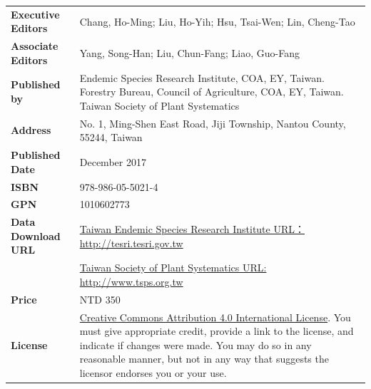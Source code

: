 \begin{table}[H]
{\begin{tabular}{>{\raggedleft\arraybackslash}p{3cm}p{10cm}}
      \textbf{Executive Editors}  & Chang, Ho-Ming; Liu, Ho-Yih; Hsu, Tsai-Wen; Lin, Cheng-Tao \\
      \textbf{Associate Editors}  & Yang, Song-Han; Liu, Chun-Fang; Liao, Guo-Fang \\
      \textbf{Published by}       & Endemic Species Research Institute, COA, EY, Taiwan.
                                    Forestry Bureau, Council of Agriculture, COA, EY, Taiwan.
                                    Taiwan Society of Plant Systematics \\
      \textbf{Address}            & No. 1, Ming-Shen East Road, Jiji Township, Nantou County, 55244, Taiwan \\
      \textbf{Published Date}     & December 2017 \\
      \textbf{ISBN}               & 978-986-05-5021-4 \\
      \textbf{GPN}                & 1010602773 \\
      \textbf{Data Download URL}  & \href{http://tesri.tesri.gov.tw}{Taiwan Endemic Species Research Institute URL：http://tesri.tesri.gov.tw} \\
                                  & \href{http://www.tsps.org.tw}{Taiwan Society of Plant Systematics URL: http://www.tsps.org.tw} \\
      \textbf{Price}              & NTD 350 \\
      \textbf{License}            & \href{https://creativecommons.org/licenses/by/4.0}{Creative Commons Attribution 4.0 International License}.
                                     You must give appropriate credit, provide a link to the license,
                                     and indicate if changes were made. You may do so in any reasonable manner,
                                     but not in any way that suggests the licensor endorses you or your use. \\
  \end{tabular}
  }
\end{table}


